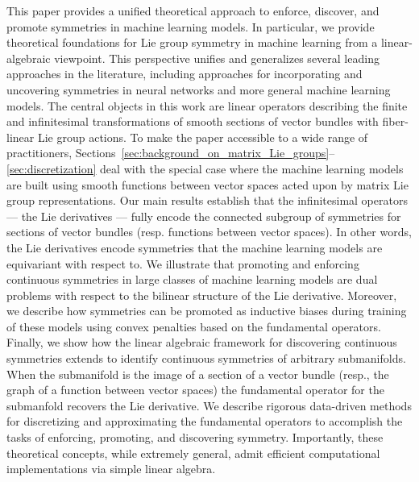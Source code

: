 \documentclass[twoside,11pt]{article}
\begin{document}
This paper provides a unified theoretical approach to enforce, discover, and promote symmetries in machine learning models. 
In particular, we provide theoretical foundations for Lie group symmetry in machine learning from a linear-algebraic viewpoint. 
This perspective unifies and generalizes several leading approaches in the literature, including approaches for incorporating and uncovering symmetries in neural networks and more general machine learning models. 
The central objects in this work are linear operators describing the finite and infinitesimal transformations of smooth sections of vector bundles with fiber-linear Lie group actions.
To make the paper accessible to a wide range of practitioners, Sections~\ref{sec:background_on_matrix_Lie_groups}--\ref{sec:discretization} deal with the special case where the machine learning models are built using smooth functions between vector spaces acted upon by matrix Lie group representations.
Our main results establish that the infinitesimal operators --- the Lie derivatives --- fully encode the connected subgroup of symmetries for sections of vector bundles (resp. functions between vector spaces).
In other words, the Lie derivatives encode symmetries that the machine learning models are equivariant with respect to. 
We illustrate that promoting and enforcing continuous symmetries in large classes of machine learning models are dual problems with respect to the bilinear structure of the Lie derivative.
Moreover, we describe how symmetries can be promoted as inductive biases during training of these models using convex penalties based on the fundamental operators.
Finally, we show how the linear algebraic framework for discovering continuous symmetries extends to identify continuous symmetries of arbitrary submanifolds.
When the submanifold is the image of a section of a vector bundle (resp., the graph of a function between vector spaces) the fundamental operator for the submanfold recovers the Lie derivative.
We describe rigorous data-driven methods for discretizing and approximating the fundamental operators to accomplish the tasks of enforcing, promoting, and discovering symmetry.
Importantly, these theoretical concepts, while extremely general, admit efficient computational implementations via simple linear algebra. 
\end{document}
